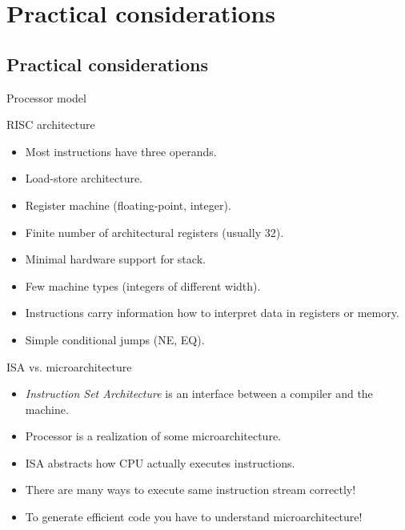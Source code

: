 \documentclass[8pt]{beamer}
\begin{document}
\section[Practice]{Practical considerations}
\subsection*{Practical considerations}

\begin{frame}{Processor model}
  \begin{block}{RISC architecture}
    \begin{itemize}
      \item Most instructions have three operands.
      \item Load-store architecture.
      \item Register machine (floating-point, integer).
      \item Finite number of architectural registers (usually 32).
      \item Minimal hardware support for stack.
      \item Few machine types (integers of different width).
      \item Instructions carry information how to interpret data in registers or memory.
      \item Simple conditional jumps (NE, EQ).
    \end{itemize}
  \end{block}

  \begin{block}{ISA vs. microarchitecture}
    \begin{itemize}
      \item \textit{Instruction Set Architecture} is an interface between a compiler and the machine.
      \item Processor is a realization of some microarchitecture.
      \item ISA abstracts how CPU actually executes instructions.
      \item There are many ways to execute same instruction stream correctly!
      \item To generate efficient code you have to understand microarchitecture!
    \end{itemize}
  \end{block}
\end{frame}
\end{document}
